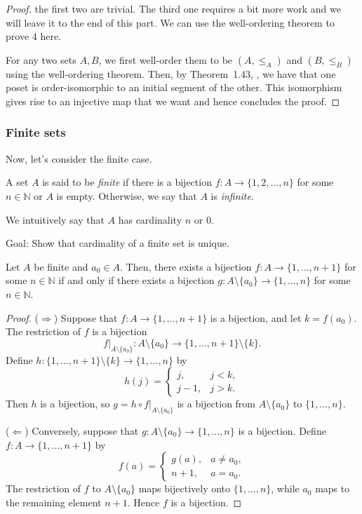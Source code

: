 \begin{proof}
  the first two are trivial. The third one requires a bit more work and we will leave it to the end of this part. We can use the well-ordering theorem to prove 4 here.

  For any two sets $A,B$, we first well-order them to be $(A,\leq_A)$ and $(B,\leq_B)$ using the well-ordering theorem. Then, by
  \ifdefined\startataxiomofchoice
    Theorem~1.43,
  \else
    ,
  \fi
  we have that one poset is order-isomorphic to an initial segment of the other. This isomorphism gives rise to an injective map that we want and hence concludes the proof.
\end{proof}

\subsubsection{Finite sets}

Now, let's consider the finite case.

\begin{definition}
  A set $A$ is said to be \emph{finite} if there is a bijection \(f\colon A\to \{1,2,\ldots,n\}\) for some \(n\in\mathbb{N}\) or $A$ is empty. Otherwise, we say that $A$ is \emph{infinite}.
\end{definition}

We intuitively say that $A$ has cardinality $n$ or $0$. 

Goal: Show that cardinality of a finite set is unique.

\begin{lemma}\label{lemma:cardinality}
  Let $A$ be finite and $a_0\in A$. Then, there exists a bijection \(f\colon A\to \{1,\ldots,n+1\}\) for some \(n\in\mathbb{N}\) if and only if there exists a bijection \(g\colon A\setminus\{a_0\}\to \{1,\ldots,n\}\) for some \(n\in\mathbb{N}\).
\end{lemma}
\begin{proof}
($\Rightarrow$) Suppose that $f\colon A\to\{1,\ldots,n+1\}$ is a bijection, and let $k=f(a_0)$. The restriction of $f$ is a bijection
\[
f|_{A\setminus\{a_0\}}\colon A\setminus\{a_0\}
\longrightarrow \{1,\ldots,n+1\}\setminus\{k\}.
\]
Define $h\colon \{1,\ldots,n+1\}\setminus\{k\}\to\{1,\ldots,n\}$ by
\[
h(j)=
\begin{cases}
j, & j<k,\\
j-1, & j>k.
\end{cases}
\]
Then $h$ is a bijection, so $g=h\circ f|_{A\setminus\{a_0\}}$ is a bijection from $A\setminus\{a_0\}$ to $\{1,\ldots,n\}$.

($\Leftarrow$) Conversely, suppose that $g\colon A\setminus\{a_0\}\to\{1,\ldots,n\}$ is a bijection. Define $f\colon A\to\{1,\ldots,n+1\}$ by
\[
f(a)=
\begin{cases}
g(a), & a\neq a_0,\\
n+1, & a=a_0.
\end{cases}
\]
The restriction of $f$ to $A\setminus\{a_0\}$ maps bijectively onto $\{1,\ldots,n\}$, while $a_0$ maps to the remaining element $n+1$. Hence $f$ is a bijection.
\end{proof}

